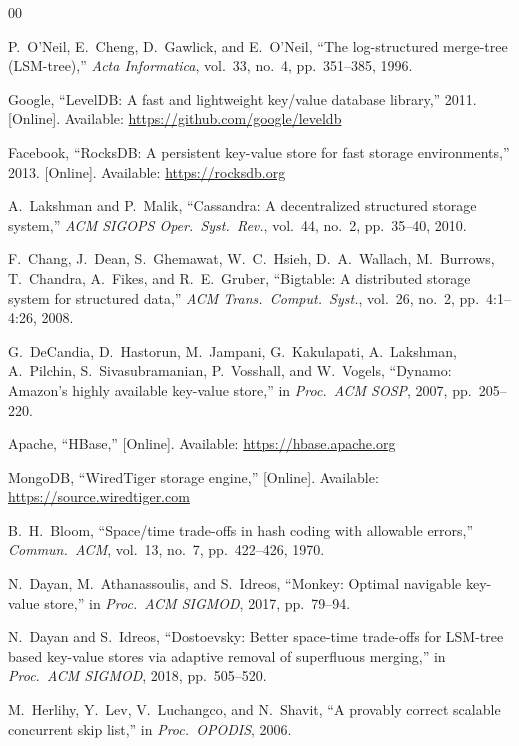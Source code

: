 \documentclass[conference]{IEEEtran}
\begin{document}
\begin{thebibliography}{00}

P.~O'Neil, E.~Cheng, D.~Gawlick, and E.~O'Neil, ``The log-structured merge-tree (LSM-tree),'' \textit{Acta Informatica}, vol.~33, no.~4, pp.~351--385, 1996.

Google, ``LevelDB: A fast and lightweight key/value database library,'' 2011. [Online]. Available: \url{https://github.com/google/leveldb}

Facebook, ``RocksDB: A persistent key-value store for fast storage environments,'' 2013. [Online]. Available: \url{https://rocksdb.org}

A.~Lakshman and P.~Malik, ``Cassandra: A decentralized structured storage system,'' \textit{ACM SIGOPS Oper.\ Syst.\ Rev.}, vol.~44, no.~2, pp.~35--40, 2010.

F.~Chang, J.~Dean, S.~Ghemawat, W.~C.~Hsieh, D.~A.~Wallach, M.~Burrows, T.~Chandra, A.~Fikes, and R.~E.~Gruber, ``Bigtable: A distributed storage system for structured data,'' \textit{ACM Trans.\ Comput.\ Syst.}, vol.~26, no.~2, pp.~4:1--4:26, 2008.

G.~DeCandia, D.~Hastorun, M.~Jampani, G.~Kakulapati, A.~Lakshman, A.~Pilchin, S.~Sivasubramanian, P.~Vosshall, and W.~Vogels, ``Dynamo: Amazon's highly available key-value store,'' in \textit{Proc.\ ACM SOSP}, 2007, pp.~205--220.

Apache, ``HBase,'' [Online]. Available: \url{https://hbase.apache.org}

MongoDB, ``WiredTiger storage engine,'' [Online]. Available: \url{https://source.wiredtiger.com}

B.~H.~Bloom, ``Space/time trade-offs in hash coding with allowable errors,'' \textit{Commun.\ ACM}, vol.~13, no.~7, pp.~422--426, 1970.

N.~Dayan, M.~Athanassoulis, and S.~Idreos, ``Monkey: Optimal navigable key-value store,'' in \textit{Proc.\ ACM SIGMOD}, 2017, pp.~79--94.

N.~Dayan and S.~Idreos, ``Dostoevsky: Better space-time trade-offs for LSM-tree based key-value stores via adaptive removal of superfluous merging,'' in \textit{Proc.\ ACM SIGMOD}, 2018, pp.~505--520.

M.~Herlihy, Y.~Lev, V.~Luchangco, and N.~Shavit, ``A provably correct scalable concurrent skip list,'' in \textit{Proc.\ OPODIS}, 2006.


\end{thebibliography}
\end{document}
